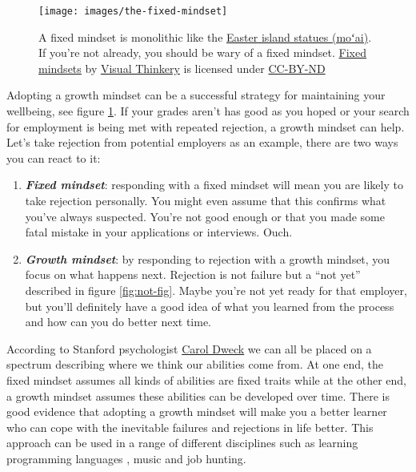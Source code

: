 \documentclass[
]{book}
\providecommand{\tightlist}{%
  \setlength{\itemsep}{0pt}\setlength{\parskip}{0pt}}
\begin{document}
\begin{figure}

{\centering \texttt{[image: images/the-fixed-mindset]} 

}

\caption{A fixed mindset is monolithic like the \href{https://en.wikipedia.org/wiki/Moai}{Easter island statues (moʻai)}. If you're not already, you should be wary of a fixed mindset. \href{https://bryanmmathers.com/fixed-mindsets/}{Fixed mindsets} by \href{https://visualthinkery.com}{Visual Thinkery} is licensed under \href{https://creativecommons.org/licenses/by-nd/4.0/}{CC-BY-ND}}\label{fig:fixedminset-fig}
\end{figure}



Adopting a growth mindset can be a successful strategy for maintaining your wellbeing, see figure \ref{fig:fixedminset-fig}. If your grades aren't has good as you hoped or your search for employment is being met with repeated rejection, a growth mindset can help. Let's take rejection from potential employers as an example, there are two ways you can react to it:

\begin{enumerate}
\def\labelenumi{\arabic{enumi}.}
\tightlist
\item
  \textbf{\emph{Fixed mindset}}: responding with a fixed mindset will mean you are likely to take rejection personally. You might even assume that this confirms what you've always suspected. You're not good enough or that you made some fatal mistake in your applications or interviews. Ouch.
\item
  \textbf{\emph{Growth mindset}}: by responding to rejection with a growth mindset, you focus on what happens next. Rejection is not failure but a ``not yet'' described in figure \ref{fig:not-fig}. Maybe you're not yet ready for that employer, but you'll definitely have a good idea of what you learned from the process and how can you do better next time.
\end{enumerate}

According to Stanford psychologist \href{https://en.wikipedia.org/wiki/Carol_Dweck}{Carol Dweck} we can all be placed on a spectrum describing where we think our abilities come from. At one end, the fixed mindset assumes all kinds of abilities are fixed traits while at the other end, a growth mindset assumes these abilities can be developed over time. \citep{dweck} There is good evidence that adopting a growth mindset will make you a better learner who can cope with the inevitable failures and rejections in life better. This approach can be used in a range of different disciplines such as learning programming languages \citep{Cutts2010}, music \citep{Davis2016} and job hunting.
\end{document}
